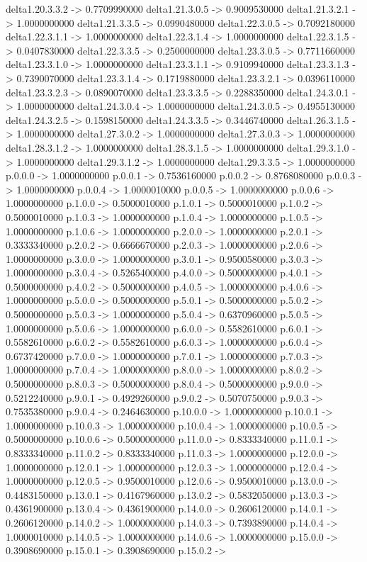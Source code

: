 delta1.20.3.3.2 -> 0.7709990000    delta1.21.3.0.5 -> 0.9009530000    delta1.21.3.2.1 -> 1.0000000000    delta1.21.3.3.5 -> 0.0990480000    delta1.22.3.0.5 -> 0.7092180000    delta1.22.3.1.1 -> 1.0000000000    delta1.22.3.1.4 -> 1.0000000000    delta1.22.3.1.5 -> 0.0407830000    delta1.22.3.3.5 -> 0.2500000000    delta1.23.3.0.5 -> 0.7711660000    delta1.23.3.1.0 -> 1.0000000000    delta1.23.3.1.1 -> 0.9109940000    delta1.23.3.1.3 -> 0.7390070000    delta1.23.3.1.4 -> 0.1719880000    delta1.23.3.2.1 -> 0.0396110000    delta1.23.3.2.3 -> 0.0890070000    delta1.23.3.3.5 -> 0.2288350000    delta1.24.3.0.1 -> 1.0000000000    delta1.24.3.0.4 -> 1.0000000000    delta1.24.3.0.5 -> 0.4955130000    delta1.24.3.2.5 -> 0.1598150000    delta1.24.3.3.5 -> 0.3446740000    delta1.26.3.1.5 -> 1.0000000000    delta1.27.3.0.2 -> 1.0000000000    delta1.27.3.0.3 -> 1.0000000000    delta1.28.3.1.2 -> 1.0000000000    delta1.28.3.1.5 -> 1.0000000000    delta1.29.3.1.0 -> 1.0000000000    delta1.29.3.1.2 -> 1.0000000000    delta1.29.3.3.5 -> 1.0000000000    p.0.0.0 -> 1.0000000000    p.0.0.1 -> 0.7536160000    p.0.0.2 -> 0.8768080000    p.0.0.3 -> 1.0000000000    p.0.0.4 -> 1.0000010000    p.0.0.5 -> 1.0000000000    p.0.0.6 -> 1.0000000000    p.1.0.0 -> 0.5000010000    p.1.0.1 -> 0.5000010000    p.1.0.2 -> 0.5000010000    p.1.0.3 -> 1.0000000000    p.1.0.4 -> 1.0000000000    p.1.0.5 -> 1.0000000000    p.1.0.6 -> 1.0000000000    p.2.0.0 -> 1.0000000000    p.2.0.1 -> 0.3333340000    p.2.0.2 -> 0.6666670000    p.2.0.3 -> 1.0000000000    p.2.0.6 -> 1.0000000000    p.3.0.0 -> 1.0000000000    p.3.0.1 -> 0.9500580000    p.3.0.3 -> 1.0000000000    p.3.0.4 -> 0.5265400000    p.4.0.0 -> 0.5000000000    p.4.0.1 -> 0.5000000000    p.4.0.2 -> 0.5000000000    p.4.0.5 -> 1.0000000000    p.4.0.6 -> 1.0000000000    p.5.0.0 -> 0.5000000000    p.5.0.1 -> 0.5000000000    p.5.0.2 -> 0.5000000000    p.5.0.3 -> 1.0000000000    p.5.0.4 -> 0.6370960000    p.5.0.5 -> 1.0000000000    p.5.0.6 -> 1.0000000000    p.6.0.0 -> 0.5582610000    p.6.0.1 -> 0.5582610000    p.6.0.2 -> 0.5582610000    p.6.0.3 -> 1.0000000000    p.6.0.4 -> 0.6737420000    p.7.0.0 -> 1.0000000000    p.7.0.1 -> 1.0000000000    p.7.0.3 -> 1.0000000000    p.7.0.4 -> 1.0000000000    p.8.0.0 -> 1.0000000000    p.8.0.2 -> 0.5000000000    p.8.0.3 -> 0.5000000000    p.8.0.4 -> 0.5000000000    p.9.0.0 -> 0.5212240000    p.9.0.1 -> 0.4929260000    p.9.0.2 -> 0.5070750000    p.9.0.3 -> 0.7535380000    p.9.0.4 -> 0.2464630000    p.10.0.0 -> 1.0000000000    p.10.0.1 -> 1.0000000000    p.10.0.3 -> 1.0000000000    p.10.0.4 -> 1.0000000000    p.10.0.5 -> 0.5000000000    p.10.0.6 -> 0.5000000000    p.11.0.0 -> 0.8333340000    p.11.0.1 -> 0.8333340000    p.11.0.2 -> 0.8333340000    p.11.0.3 -> 1.0000000000    p.12.0.0 -> 1.0000000000    p.12.0.1 -> 1.0000000000    p.12.0.3 -> 1.0000000000    p.12.0.4 -> 1.0000000000    p.12.0.5 -> 0.9500010000    p.12.0.6 -> 0.9500010000    p.13.0.0 -> 0.4483150000    p.13.0.1 -> 0.4167960000    p.13.0.2 -> 0.5832050000    p.13.0.3 -> 0.4361900000    p.13.0.4 -> 0.4361900000    p.14.0.0 -> 0.2606120000    p.14.0.1 -> 0.2606120000    p.14.0.2 -> 1.0000000000    p.14.0.3 -> 0.7393890000    p.14.0.4 -> 1.0000010000    p.14.0.5 -> 1.0000000000    p.14.0.6 -> 1.0000000000    p.15.0.0 -> 0.3908690000    p.15.0.1 -> 0.3908690000    p.15.0.2 -> 